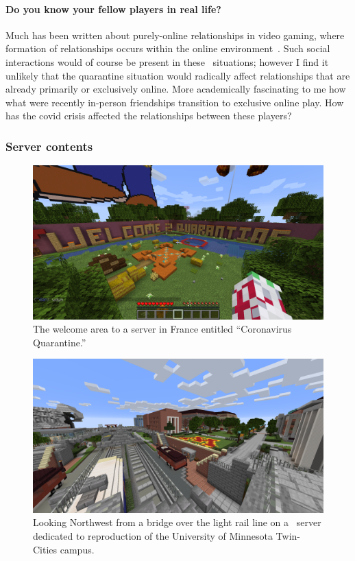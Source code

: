 \documentclass[russian,american]{../../../coursework}
\newcommand{\mc}{\citetitle{Minecraft}}
\begin{document}
\paragraph{Do you know your fellow players in real life?}

Much has been written about purely-online relationships in video gaming, where
formation of relationships occurs within the online environment~\parencite{Gallup2016,Marsh2014,Williams2006}.
Such social interactions would of course be present in these \mc\ situations; however
I find it unlikely that the quarantine situation would radically affect relationships
that are already primarily or exclusively online.
More academically fascinating to me how what were recently in-person friendships
transition to exclusive online play. How has the \ac{covid} crisis affected the relationships
between these players?

\subsubsection{Server contents}

\begin{figure}[t]
	\centering
	\includegraphics[width=\textwidth]{screenshot_2020-04-18_91.121.134.152.png}
	\caption{The welcome area to a server in France entitled \enquote{Coronavirus Quarantine.}}
	\label{fig:spawnsign}
\end{figure}

\begin{figure}[t]
	\centering
	\includegraphics[width=\textwidth]{screenshot_2020-04-25_goldycraft.png}
	\caption{Looking Northwest from a bridge over the light rail line on a \mc\ server dedicated to
			reproduction of the University of Minnesota Twin-Cities campus.}
	\label{fig:goldycraft}
\end{figure}
\end{document}
